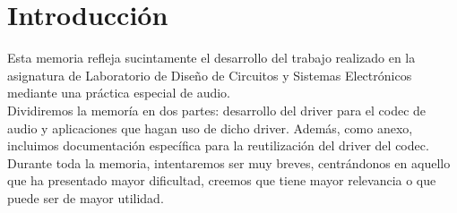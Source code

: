 \documentclass[a4paper, 12pt]{article}
\begin{document}
  

	
\newpage
\tableofcontents
\listoffigures

\newpage
\section{Introducción}
	Esta memoria refleja sucintamente el desarrollo del trabajo realizado en la asignatura de Laboratorio de Diseño de Circuitos y Sistemas Electrónicos mediante una práctica especial de audio.\\

	Dividiremos la memoría en dos partes: desarrollo del driver para el codec de audio y aplicaciones que hagan uso de dicho driver. Además, como anexo, incluimos documentación específica para la reutilización del driver del codec.\\

	Durante toda la memoria, intentaremos ser muy breves, centrándonos en aquello que ha presentado mayor dificultad, creemos que tiene mayor relevancia o que puede ser de mayor utilidad.

\newpage


\newpage


\newpage


\newpage




	
\end{document}

